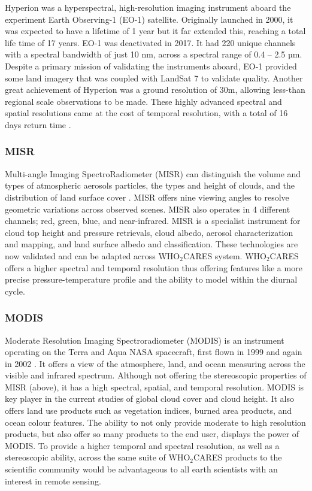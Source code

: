 \documentclass{scrartcl}
\newcommand{\whocares}{WHO$_2$CARES }
\begin{document}
Hyperion was a hyperspectral, high-resolution
imaging instrument aboard the experiment Earth Observing-1 (EO-1) satellite.
Originally launched in 2000, it was expected to have a lifetime of 1 year but it
far extended this, reaching a total life time of 17 years. EO-1 was deactivated
in 2017. It had 220 unique channels with a spectral bandwidth of just 10 nm,
across a spectral range of 0.4 – 2.5 µm. Despite a primary mission of validating
the instruments aboard, EO-1 provided some land imagery that was coupled with
LandSat 7 to validate quality. Another great achievement of Hyperion was a
ground resolution of 30m, allowing less-than regional scale observations to be
made. These highly advanced spectral and spatial resolutions came at the cost of
temporal resolution, with a total of 16 days return time \citep{principles}.

\subsubsection{MISR}
\label{sec:org8418862}

Multi-angle Imaging SpectroRadiometer (MISR) can distinguish the volume and
types of atmospheric aerosols particles, the types and height of clouds, and the
distribution of land surface cover \citep{diner}. MISR offers nine
viewing angles to resolve geometric variations across observed scenes. MISR also
operates in 4 different channels; red, green, blue, and near-infrared. MISR is a
specialist instrument for cloud top height and pressure retrievals, cloud
albedo, aerosol characterization and mapping, and land surface albedo and
classification. These technologies are now validated and can be adapted across
\whocares system. \whocares offers a higher spectral and temporal resolution
thus offering features like a more precise pressure-temperature profile and the
ability to model within the diurnal cycle.

\subsubsection{MODIS}
\label{sec:org3363f5b}

Moderate Resolution Imaging Spectroradiometer (MODIS) is an instrument
operating on the Terra and Aqua NASA spacecraft, first flown in 1999 and again
in 2002 \citep{modis}. It offers a view of the atmosphere, land, and
ocean measuring across the visible and infrared spectrum. Although not offering
the stereoscopic properties of MISR (above), it has a high spectral, spatial,
and temporal resolution. MODIS is key player in the current studies of global
cloud cover and cloud height. It also offers land use products such as
vegetation indices, burned area products, and ocean colour features. The ability
to not only provide moderate to high resolution products, but also offer so many
products to the end user, displays the power of MODIS. To provide a higher
temporal and spectral resolution, as well as a stereoscopic ability, across the
same suite of \whocares products to the scientific community would be
advantageous to all earth scientists with an interest in remote sensing.
\end{document}
